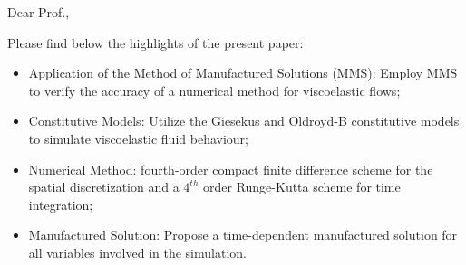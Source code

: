 \documentclass{letter}
\begin{document}
Dear Prof.,

Please find below the highlights of the present paper:

\begin{itemize}
 \item Application of the Method of Manufactured Solutions (MMS): Employ MMS to verify the accuracy of a numerical method for viscoelastic flows;
 \item Constitutive Models: Utilize the Giesekus and Oldroyd-B constitutive models to simulate viscoelastic fluid behaviour;
 \item Numerical Method: fourth-order compact finite difference scheme for the spatial discretization and a $4^{th}$ order Runge-Kutta scheme for time integration;
 \item Manufactured Solution: Propose a time-dependent manufactured solution for all variables involved in the simulation.
\end{itemize}
\end{document}
